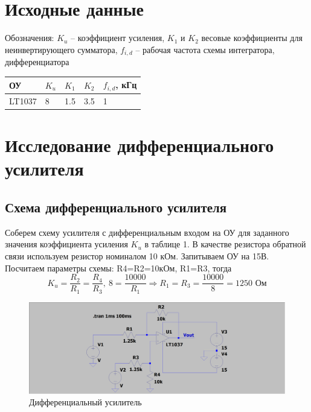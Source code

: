 \documentclass[a4paper, 12pt]{article}
\begin{document}
    \section{Исходные данные}
    Обозначения: $K_u$ -- коэффициент усиления, $K_1$ и $K_2$ весовые коэффициенты для неинвертирующего сумматора,
    $f_{i,d}$ -- рабочая частота схемы интегратора, дифференциатора
    \begin{center}
        \begin{tabular}{ | m{4em} | m{4em}| m{4em} | m{4em} | m{4em} | } 
        \hline
        ОУ& $K_u$ &$K_1$ &$K_2$ &$f_{i,d}$, кГц\\ 
        \hline
        LT1037& 8 & 1.5 &3.5 &1\\ 
        \hline
        \end{tabular}
    \end{center}


    \section{Исследование дифференциального усилителя}
    \subsection{Схема дифференциального усилителя}
    Соберем схему усилителя с дифференциальным входом на ОУ
    для заданного значения коэффициента усиления $K_u$ в таблице 1.
    В качестве резистора обратной связи используем резистор номиналом 10 кОм.
    Запитываем ОУ на 15В. Посчитаем параметры схемы: R4=R2=10кОм, R1=R3, тогда
    $$
    K_u=\dfrac{R_2}{R_1}=\dfrac{R_4}{R_3},\ 8=\dfrac{10000}{R_1}\Rightarrow R_1=R_3=\dfrac{10000}{8}=1250\text{ Ом}
    $$
    \begin{figure}[H]
        \centering
        \includegraphics[scale=0.22]{scheme1.png}
        \captionsetup{skip=0pt}
        \caption{Дифференциальный усилитель}
        \label{fig:scheme1}
    \end{figure}
\end{document}
